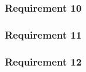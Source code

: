 \subsubsection*{Requirement 10}

\subsubsection*{Requirement 11}

\subsubsection*{Requirement 12}














